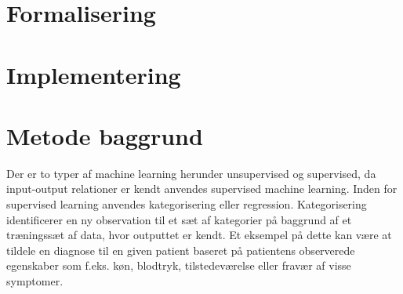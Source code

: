 \section{Formalisering}


\section{Implementering}



\section{Metode baggrund}
Der er to typer af machine learning herunder unsupervised og supervised, da input-output relationer er kendt anvendes supervised machine learning. Inden for supervised learning anvendes kategorisering eller regression. Kategorisering identificerer en ny observation til et sæt af kategorier på baggrund af et træningssæt af data, hvor outputtet er kendt. Et eksempel på dette kan være at tildele en diagnose til en given patient baseret på patientens observerede egenskaber som f.eks. køn, blodtryk, tilstedeværelse eller fravær af visse symptomer. 


